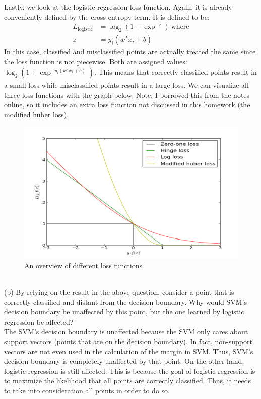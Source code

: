 \documentclass[12pt]{article}
\begin{document}
	Lastly, we look at the logistic regression loss function. Again, it is already conveniently defined by the cross-entropy term. It is defined to be:
		\begin{align*}
		L_{\text{logistic}} &= \log_2(1+\exp^{-z}) \ \text{where} \\
		z&= y_i(w^Tx_i+b)
		\end{align*}
	In this case, classified and misclassified points are actually treated the same since the loss function is not piecewise. Both are assigned values: $\log_2(1+\exp^{-y_i(w^Tx_i+b)})$. This means that correctly classified points result in a small loss while misclassified points result in a large loss. We can visualize all three loss functions with the graph below. Note: I borrowed this from the notes online, so it includes an extra loss function not discussed in this homework (the modified huber loss).
	\begin{figure}[h]
		\begin{center}
			\includegraphics[width=5in]{unified_loss.png}
			\caption{An overview of different loss functions}
			\label{fig:sigmoidEx}
		\end{center}
	\end{figure}
	\\
	(b) By relying on the result in the above question, consider a point that is correctly classified and distant from the decision boundary. Why would SVM’s decision boundary be unaffected by this point, but the one learned by logistic regression be affected? \\
	The SVM's decision boundary is unaffected because the SVM only cares about support vectors (points that are on the decision boundary). In fact, non-support vectors are not even used in the calculation of the margin in SVM. Thus, SVM's decision boundary is completely unaffected by that point. On the other hand, logistic regression is still affected. This is because the goal of logistic regression is to maximize the likelihood that all points are correctly classified. Thus, it needs to take into consideration all points in order to do so. 
	
\end{document}
